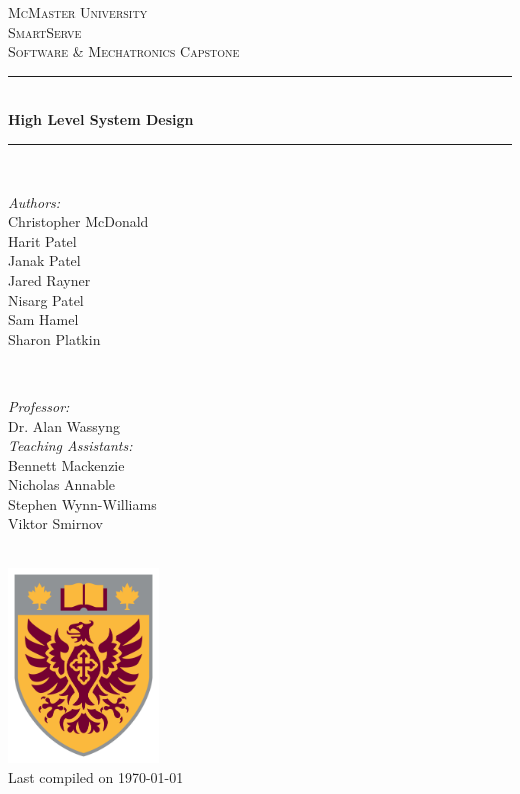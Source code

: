 \documentclass[11pt]{article}
\begin{document}
\begin{titlepage}
	\newcommand{\HRule}{\rule{\linewidth}{0.2mm}}
	\begin{center}
	\textsc{\LARGE McMaster University}\\[1.5cm]
	
	\textsc{\Large SmartServe}\\[0.5cm]
	\textsc{\large Software \& Mechatronics Capstone}\\[0.5cm] 

	\HRule\\[0.4cm]
		{\huge\bfseries High Level System Design}\\[0.4cm]
	\HRule\\[0.4cm]
	
	\begin{minipage}[t][][t]{0.5\textwidth}
		\begin{flushleft} \large
			\emph{Authors:}\\
			Christopher McDonald\\
			Harit Patel \\
			Janak Patel \\
			Jared Rayner  \\
			Nisarg Patel  \\
			Sam Hamel \\
			Sharon Platkin \\
		\end{flushleft}
	\end{minipage}
	~
	\begin{minipage}[t][][t]{0.4\textwidth}
		\begin{flushright} \large
			\emph{Professor:} \\
			Dr. Alan Wassyng \\[0.4cm]
			\emph{Teaching Assistants:} \\
			Bennett Mackenzie \\ 
			Nicholas Annable \\ 
			Stephen Wynn-Williams \\ 
			Viktor Smirnov
		\end{flushright}
	\end{minipage}\\[2cm]
	
	\includegraphics[width=0.3\textwidth]{logo.png} \\
	{\large Last compiled on \today}
	\end{center}

\end{titlepage}
\end{document}
